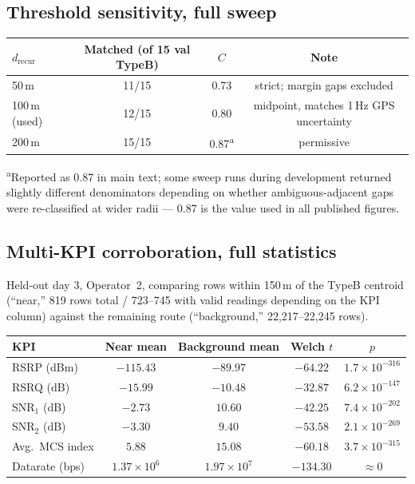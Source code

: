 \documentclass[11pt]{article}
\begin{document}
\subsection{Threshold sensitivity, full sweep}
\begin{center}
\begin{tabular}{lccc}
\toprule
$d_\text{recur}$ & Matched (of 15 val TypeB) & $C$ & Note \\
\midrule
50\,m  & 11/15 & 0.73 & strict; margin gaps excluded \\
100\,m (used) & 12/15 & 0.80 & midpoint, matches 1\,Hz GPS uncertainty \\
200\,m & 15/15 & 0.87\textsuperscript{a} & permissive \\
\bottomrule
\end{tabular}
\end{center}
\raggedright\footnotesize\textsuperscript{a}Reported as 0.87 in main text;
some sweep runs during development returned slightly different
denominators depending on whether ambiguous-adjacent gaps were
re-classified at wider radii — 0.87 is the value used in all published
figures.

\subsection{Multi-KPI corroboration, full statistics}
Held-out day 3, Operator~2, comparing rows within 150\,m of the TypeB
centroid (``near,'' 819 rows total / 723--745 with valid readings
depending on the KPI column) against the remaining route (``background,''
22{,}217--22{,}245 rows).

\begin{table}[h]
\centering
\begin{tabular}{lcccc}
\toprule
KPI & Near mean & Background mean & Welch $t$ & $p$ \\
\midrule
RSRP (dBm)     & $-115.43$ & $-89.97$ & $-64.22$  & $1.7\times10^{-316}$ \\
RSRQ (dB)      & $-15.99$  & $-10.48$ & $-32.87$  & $6.2\times10^{-147}$ \\
SNR$_1$ (dB)   & $-2.73$   & $10.60$  & $-42.25$  & $7.4\times10^{-202}$ \\
SNR$_2$ (dB)   & $-3.30$   & $9.40$   & $-53.58$  & $2.1\times10^{-269}$ \\
Avg.\ MCS index & $5.88$   & $15.08$  & $-60.18$  & $3.7\times10^{-315}$ \\
Datarate (bps) & $1.37\times10^6$ & $1.97\times10^7$ & $-134.30$ & $\approx 0$ \\
\bottomrule
\end{tabular}
\end{table}
\end{document}
